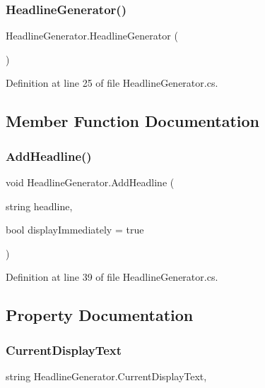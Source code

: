 \subsubsection{\texorpdfstring{Headline\+Generator()}{HeadlineGenerator()}}
{\footnotesize\ttfamily Headline\+Generator.\+Headline\+Generator (\begin{DoxyParamCaption}{ }\end{DoxyParamCaption})}



Definition at line 25 of file Headline\+Generator.\+cs.



\subsection{Member Function Documentation}
\mbox{\label{class_headline_generator_a3d594234aaddb0a385ea7026e8aafe11}} 
\subsubsection{\texorpdfstring{Add\+Headline()}{AddHeadline()}}
{\footnotesize\ttfamily void Headline\+Generator.\+Add\+Headline (\begin{DoxyParamCaption}\item[{string}]{headline,  }\item[{bool}]{display\+Immediately = {\ttfamily true} }\end{DoxyParamCaption})}



Definition at line 39 of file Headline\+Generator.\+cs.



\subsection{Property Documentation}
\mbox{\label{class_headline_generator_ae64070408dd3e9ef4c45b777f82bdd96}} 
\subsubsection{\texorpdfstring{Current\+Display\+Text}{CurrentDisplayText}}
{\footnotesize\ttfamily string Headline\+Generator.\+Current\+Display\+Text\hspace{0.3cm}{\ttfamily [get]}, {}}



